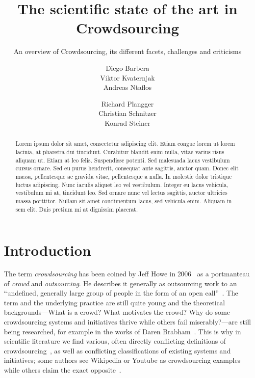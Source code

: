 \documentclass{sig-alternate}
\begin{document}
\title{The scientific state of the art in Crowdsourcing}
\subtitle{An overview of Crowdsourcing, its different facets, challenges and criticisms}


\author{%
	\alignauthor
	Diego Barbera\\ 
%
	\alignauthor
	Viktor Kvaternjak\\
%
	\alignauthor
	Andreas Ntaflos\\
%
	\and
%
	\alignauthor
	Richard Plangger\\ 
%
	\alignauthor
	Christian Schnitzer\\ 
%
	\alignauthor
	Konrad Steiner\\ 
	\and
}

\maketitle

\begin{abstract}
	Lorem ipsum dolor sit amet, consectetur adipiscing elit. Etiam congue
	lorem ut lorem lacinia, at pharetra dui tincidunt. Curabitur blandit enim
	nulla, vitae varius risus aliquam ut. Etiam at leo felis. Suspendisse
	potenti. Sed malesuada lacus vestibulum cursus ornare. Sed eu purus
	hendrerit, consequat ante sagittis, auctor quam. Donec elit massa,
	pellentesque ac gravida vitae, pellentesque a nulla. In molestie dolor
	tristique luctus adipiscing. Nunc iaculis aliquet leo vel vestibulum.
	Integer eu lacus vehicula, vestibulum mi at, tincidunt leo. Sed ornare
	nunc vel lectus sagittis, auctor ultricies massa porttitor. Nullam sit
	amet condimentum lacus, sed vehicula enim. Aliquam in sem elit. Duis
	pretium mi at dignissim placerat.
\end{abstract}

\section{Introduction}

The term \emph{crowdsourcing} has been coined by Jeff Howe in
2006~\cite{howe2006rise} as a portmanteau of \emph{crowd} and
\emph{outsourcing}. He describes it generally as outsourcing work to an
``undefined, generally large group of people in the form of an open
call''~\cite{howe2009crowdsourcing}. The term and the underlying practice are
still quite young and the theoretical backgrounds---What is a crowd? What
motivates the crowd? Why do some crowdsourcing systems and initiatives thrive
while others fail miserably?---are still being researched, for example in the
works of Daren Brabham~\cite{brabham2008crowdsourcing, brabham2008moving,
brabham2010moving}. This is why in scientific literature we find various,
often directly conflicting definitions of
crowdsourcing~\cite{estelles2012towards}, as well as conflicting
classifications of existing systems and initiatives; some authors see
Wikipedia or Youtube as crowdsourcing examples while others claim the exact
opposite~\cite{estelles2012towards}.
\end{document}
